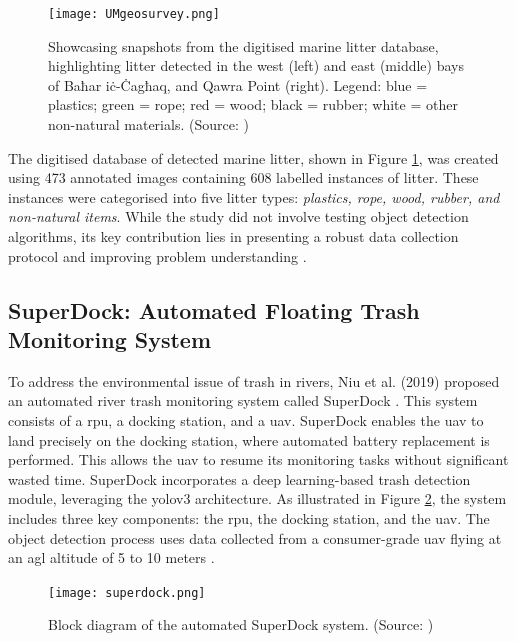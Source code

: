 \begin{figure}[!htbp]
    \centering
    \texttt{[image: UMgeosurvey.png]}
    \caption{Showcasing snapshots from the digitised marine litter database, highlighting litter detected in the west (left) and east (middle) bays of Baħar iċ-Ċagħaq, and Qawra Point (right). Legend: blue = plastics; green = rope; red = wood; black = rubber; white = other non-natural materials. (Source: \cite{umgeosurvey})}
    \label{fig:geosurvey}
\end{figure}

The digitised database of detected marine litter, shown in Figure \ref{fig:geosurvey}, was created using 473 annotated images containing 608 labelled instances of litter. These instances were categorised into five litter types: \textit{plastics, rope, wood, rubber, and non-natural items}. While the study did not involve testing object detection algorithms, its key contribution lies in presenting a robust data collection protocol and improving problem understanding \cite{umgeosurvey}.

\subsection{SuperDock: Automated Floating Trash Monitoring System}
\label{subsec:3_superdock}

To address the environmental issue of trash in rivers, Niu et al. (2019) proposed an automated river trash monitoring system called SuperDock \cite{superdock}. This system consists of a \gls{rpu}, a docking station, and a \gls{uav}. SuperDock enables the \gls{uav} to land precisely on the docking station, where automated battery replacement is performed. This allows the \gls{uav} to resume its monitoring tasks without significant wasted time. SuperDock incorporates a deep learning-based trash detection module, leveraging the \gls{yolo}v3 architecture. As illustrated in Figure \ref{fig:superdock}, the system includes three key components: the \gls{rpu}, the docking station, and the \gls{uav}. The object detection process uses data collected from a consumer-grade \gls{uav} flying at an \gls{agl} altitude of 5 to 10 meters \cite{superdock}.

\begin{figure}[!htbp]
    \centering
    \texttt{[image: superdock.png]}
    \caption{Block diagram of the automated SuperDock system. (Source: \cite{superdock})}
    \label{fig:superdock}
\end{figure}

